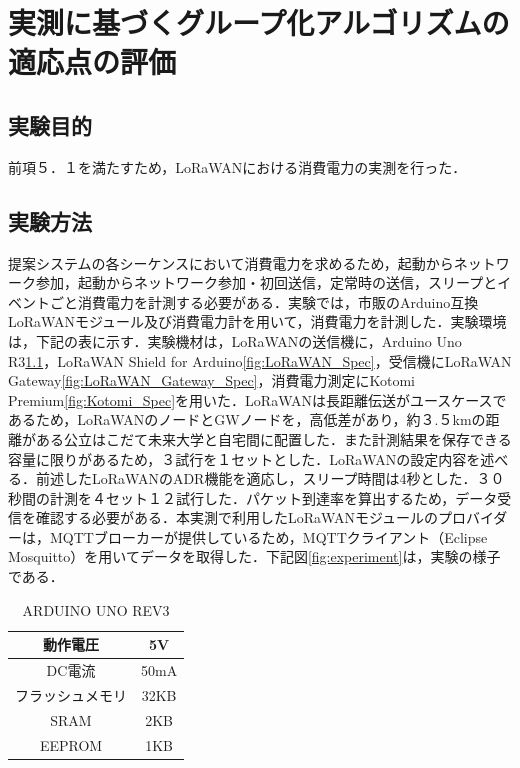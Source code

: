 \chapter{実測に基づくグループ化アルゴリズムの適応点の評価}

\section{実験目的}
前項５．１を満たすため，LoRaWANにおける消費電力の実測を行った．

\section{実験方法}
提案システムの各シーケンスにおいて消費電力を求めるため，起動からネットワーク参加，起動からネットワーク参加・初回送信，定常時の送信，スリープとイベントごと消費電力を計測する必要がある．実験では，市販のArduino互換LoRaWANモジュール及び消費電力計を用いて，消費電力を計測した．実験環境は，下記の表に示す．実験機材は，LoRaWANの送信機に，Arduino Uno R3\ref{fig:Arduino_Spec}，LoRaWAN Shield for Arduino\ref{fig:LoRaWAN_Spec}，受信機にLoRaWAN Gateway\ref{fig:LoRaWAN_Gateway_Spec}，消費電力測定にKotomi Premium\ref{fig:Kotomi_Spec}を用いた．LoRaWANは長距離伝送がユースケースであるため，LoRaWANのノードとGWノードを，高低差があり，約３.５kmの距離がある公立はこだて未来大学と自宅間に配置した．また計測結果を保存できる容量に限りがあるため，３試行を１セットとした．LoRaWANの設定内容を述べる．前述したLoRaWANのADR機能を適応し，スリープ時間は4秒とした．３０秒間の計測を４セット１２試行した．パケット到達率を算出するため，データ受信を確認する必要がある．本実測で利用したLoRaWANモジュールのプロバイダーは，MQTTブローカーが提供しているため，MQTTクライアント（Eclipse Mosquitto）を用いてデータを取得した．下記図\ref{fig:experiment}は，実験の様子である．

\begin{table}[]
    \caption{ARDUINO UNO REV3}\label{fig:Arduino_Spec}
    \centering
    \begin{tabular}{|c|c|}
    \hline
    動作電圧     & 5V   \\ \hline
    DC電流     & 50mA \\ \hline
    フラッシュメモリ & 32KB \\ \hline
    SRAM     & 2KB  \\ \hline
    EEPROM   & 1KB  \\ \hline
    \end{tabular}
\end{table}

